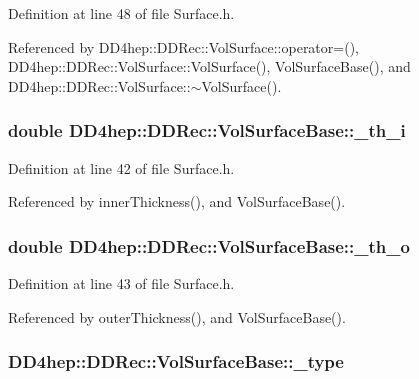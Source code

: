 Definition at line 48 of file Surface.h.

Referenced by DD4hep::DDRec::VolSurface::operator=(), DD4hep::DDRec::VolSurface::VolSurface(), VolSurfaceBase(), and DD4hep::DDRec::VolSurface::$\sim$VolSurface().\hypertarget{class_d_d4hep_1_1_d_d_rec_1_1_vol_surface_base_a50793721953f298992a3c98f3b77053d}{
\subsubsection[{\_\-th\_\-i}]{\setlength{\rightskip}{0pt plus 5cm}double {\bf DD4hep::DDRec::VolSurfaceBase::\_\-th\_\-i}}}
\label{class_d_d4hep_1_1_d_d_rec_1_1_vol_surface_base_a50793721953f298992a3c98f3b77053d}


Definition at line 42 of file Surface.h.

Referenced by innerThickness(), and VolSurfaceBase().\hypertarget{class_d_d4hep_1_1_d_d_rec_1_1_vol_surface_base_ab60dbb9ad72a790cbfa119edaa225e36}{
\subsubsection[{\_\-th\_\-o}]{\setlength{\rightskip}{0pt plus 5cm}double {\bf DD4hep::DDRec::VolSurfaceBase::\_\-th\_\-o}}}
\label{class_d_d4hep_1_1_d_d_rec_1_1_vol_surface_base_ab60dbb9ad72a790cbfa119edaa225e36}


Definition at line 43 of file Surface.h.

Referenced by outerThickness(), and VolSurfaceBase().\hypertarget{class_d_d4hep_1_1_d_d_rec_1_1_vol_surface_base_a7a377fec84bd131b42eb0fb672585850}{
\subsubsection[{\_\-type}]{ {\bf DD4hep::DDRec::VolSurfaceBase::\_\-type}}}
\label{class_d_d4hep_1_1_d_d_rec_1_1_vol_surface_base_a7a377fec84bd131b42eb0fb672585850}


